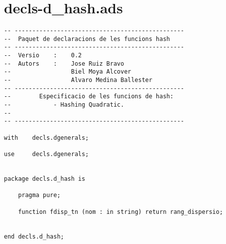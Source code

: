 \documentclass[10pt]{report}
\begin{document}
    \section{decls-d\_hash.ads}
    \begin{lstlisting}[style=Ada]
-- ------------------------------------------------
--  Paquet de declaracions de les funcions hash
-- ------------------------------------------------
--  Versio    :    0.2
--  Autors    :    Jose Ruiz Bravo
--                 Biel Moya Alcover
--                 Alvaro Medina Ballester
-- ------------------------------------------------
--        Especificacio de les funcions de hash:
--            - Hashing Quadratic.
--
-- ------------------------------------------------

with    decls.dgenerals;

use     decls.dgenerals;


package decls.d_hash is

    pragma pure;

    function fdisp_tn (nom : in string) return rang_dispersio;
    
    
end decls.d_hash;
    \end{lstlisting}
    \newpage
    
\end{document}
